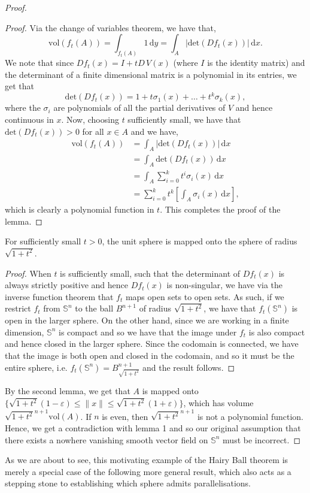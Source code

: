 \begin{proof}
\begin{proof}
Via the change of variables theorem, we have that,
\[
\mathrm{vol}(f_t(A))=\int_{f_t(A)}1\,\mathrm{d}y=\int_A|\mathrm{det}(Df_t(x))|\,\mathrm{d}x.
\]
We note that since $Df_t(x)=I+tD\,V(x)$ (where $I$ is the identity matrix) and the determinant of a finite dimensional matrix is a polynomial in its entries, we get that \[\mathrm{det}(Df_t(x))=1+t\sigma_1(x)+\ldots+t^k\sigma_k(x),\] where the $\sigma_i$ are polynomials of all the partial derivatives of $V$ and hence continuous in $x$. Now, choosing $t$ sufficiently small, we have that $\mathrm{det}(Df_t(x))>0$ for all $x\in A$ and we have,
\begin{align*}
\mathrm{vol}(f_t(A))&=\int_A|\mathrm{det}(Df_t(x))|\,\mathrm{d}x\\
&=\int_A\mathrm{det}(Df_t(x))\,\mathrm{d}x\\
&=\int_A\sum_{i=0}^kt^i\sigma_i(x)\,\mathrm{d}x\\
&=\sum_{i=0}^kt^k\left[\int_A\sigma_i(x)\,\mathrm{d}x\right],
\end{align*}
which is clearly a polynomial function in $t$. This completes the proof of the lemma.
\end{proof}
\begin{lemma}
For sufficiently small $t>0$, the unit sphere is mapped onto the sphere of radius $\sqrt{1+t^2}$.
\end{lemma}
\begin{proof}
When $t$ is sufficiently small, such that the determinant of $Df_t(x)$ is always strictly positive and hence $Df_t(x)$ is non-singular, we have via the inverse function theorem that $f_t$ maps open sets to open sets. As such, if we restrict $f_t$ from $\mathbb{S}^n$ to the ball $B^{n+1}$ of radius $\sqrt{1+t^2}$, we have that $f_t(\mathbb{S}^n)$ is open in the larger sphere. On the other hand, since we are working in a finite dimension, $\mathbb{S}^n$ is compact and so we have that the image under $f_t$ is also compact and hence closed in the larger sphere. Since the codomain is connected, we have that the image is both open and closed in the codomain, and so it must be the entire sphere, i.e. $f_t(\mathbb{S}^n)=B^{n+1}_{\sqrt{1+t^2}}$ and the result follows. 
\end{proof}
By the second lemma, we get that $A$ is mapped onto $\{\sqrt{1+t^2}(1-\varepsilon)\leq\|x\|\leq\sqrt{1+t^2}(1+\varepsilon)\}$, which has volume $\sqrt{1+t^2}^{n+1}\mathrm{vol}(A)$. If $n$ is even, then $\sqrt{1+t^2}^{n+1}$ is not a polynomial function. Hence, we get a contradiction with lemma 1 and so our original assumption that there exists a nowhere vanishing smooth vector field on $\mathbb{S}^n$ must be incorrect.
\end{proof}
As we are about to see, this motivating example of the Hairy Ball theorem is merely a special case of the following more general result, which also acts as a stepping stone to establishing which sphere admits parallelisations.\\

